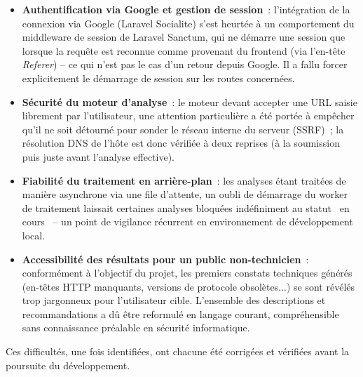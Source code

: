 \begin{itemize}[nosep]
  \item \textbf{Authentification via Google et gestion de session}~:
    l'int\'egration de la connexion via Google (Laravel Socialite) s'est
    heurt\'ee \`a un comportement du middleware de session de Laravel Sanctum,
    qui ne d\'emarre une session que lorsque la requ\^ete est reconnue comme
    provenant du frontend (via l'en-t\^ete \emph{Referer}) -- ce qui n'est pas le
    cas d'un retour depuis Google. Il a fallu forcer explicitement le d\'emarrage
    de session sur les routes concern\'ees.
  \item \textbf{S\'ecurit\'e du moteur d'analyse}~: le moteur devant accepter une
    URL saisie librement par l'utilisateur, une attention particuli\`ere a \'et\'e
    port\'ee \`a emp\^echer qu'il ne soit d\'etourn\'e pour sonder le r\'eseau interne
    du serveur (SSRF)~; la r\'esolution DNS de l'h\^ote est donc v\'erifi\'ee \`a deux
    reprises (\`a la soumission puis juste avant l'analyse effective).
  \item \textbf{Fiabilit\'e du traitement en arri\`ere-plan}~: les analyses \'etant
    trait\'ees de mani\`ere asynchrone via une file d'attente, un oubli de
    d\'emarrage du worker de traitement laissait certaines analyses bloqu\'ees
    ind\'efiniment au statut \og~en cours~\fg{} -- un point de vigilance
    r\'ecurrent en environnement de d\'eveloppement local.
  \item \textbf{Accessibilit\'e des r\'esultats pour un public non-technicien}~:
    conform\'ement \`a l'objectif du projet, les premiers constats techniques
    g\'en\'er\'es (en-t\^etes HTTP manquants, versions de protocole obsol\`etes...)
    se sont r\'ev\'el\'es trop jargonneux pour l'utilisateur cible. L'ensemble des
    descriptions et recommandations a d\^u \^etre reformul\'e en langage courant,
    compr\'ehensible sans connaissance pr\'ealable en s\'ecurit\'e informatique.
\end{itemize}

Ces difficult\'es, une fois identifi\'ees, ont chacune \'et\'e corrig\'ees et
v\'erifi\'ees avant la poursuite du d\'eveloppement.
